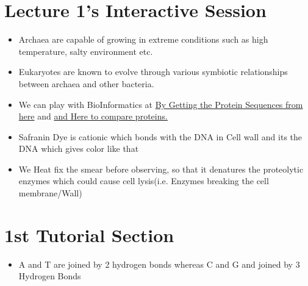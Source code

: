 \documentclass{article}
\begin{document}
\section{Lecture 1's Interactive Session}
\begin{itemize}
    \item Archaea are capable of growing in extreme conditions such as high temperature, salty environment etc.
     \item Eukaryotes are known to evolve through various symbiotic relationships between archaea and other bacteria.
     \item We can play with BioInformatics at \href{https://www.ncbi.nlm.nih.gov/}{By Getting the Protein Sequences from here} and \href{https://www.ebi.ac.uk/Tools/msa/clustalo/}{and Here to compare proteins.}
     \item Safranin Dye is cationic which bonds with the DNA in Cell wall and its the DNA which gives color like that
     \item We Heat fix the smear before observing, so that it denatures the proteolytic enzymes which could cause cell lysis(i.e. Enzymes breaking the cell membrane/Wall)
\end{itemize}

\section{1st Tutorial Section}
    \begin{itemize}
        \item A and T are joined by 2 hydrogen bonds whereas C and G and joined by 3 Hydrogen Bonds
    \end{itemize}
\end{document}
